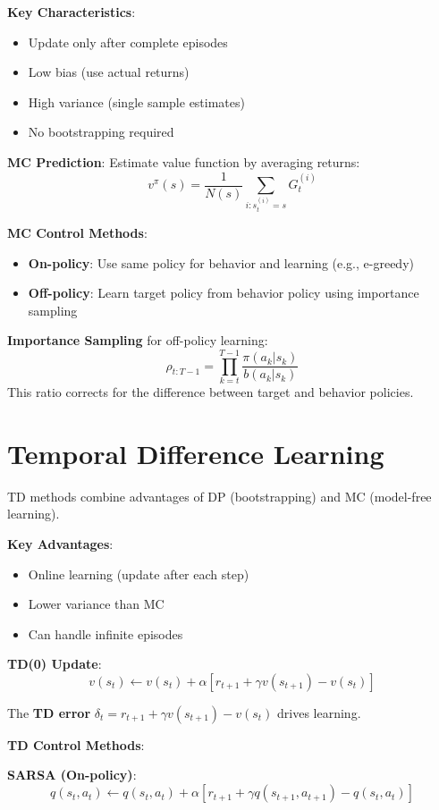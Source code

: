 \documentclass[a4paper,11pt]{article}
\newcommand{\cf}[1]{\[#1\]}
\newcommand{\f}[1]{${#1}$}
\renewcommand{\b}[1]{\textbf{#1}}
\begin{document}
\b{Key Characteristics}:
\begin{itemize}
    \item Update only after complete episodes
    \item Low bias (use actual returns)
    \item High variance (single sample estimates)
    \item No bootstrapping required
\end{itemize}

\textbf{MC Prediction}: Estimate value function by averaging returns:
\cf{v^\pi(s) = \frac{1}{N(s)} \sum_{i: s_t^{(i)} = s} G_t^{(i)}}

\b{MC Control Methods}:
\begin{itemize}
    \item \textbf{On-policy}: Use same policy for behavior and learning (e.g., e-greedy)
    \item \textbf{Off-policy}: Learn target policy from behavior policy using importance sampling
\end{itemize}

\textbf{Importance Sampling} for off-policy learning:
\cf{\rho_{t:T-1} = \prod_{k=t}^{T-1} \frac{\pi(a_k|s_k)}{b(a_k|s_k)}}
This ratio corrects for the difference between target and behavior policies.

\section{Temporal Difference Learning}

TD methods combine advantages of DP (bootstrapping) and MC (model-free learning).

\b{Key Advantages}:
\begin{itemize}
    \item Online learning (update after each step)
    \item Lower variance than MC
    \item Can handle infinite episodes
\end{itemize}

\textbf{TD(0) Update}:
\cf{v(s_t) \leftarrow v(s_t) + \alpha[r_{t+1} + \gamma v(s_{t+1}) - v(s_t)]}

The \textbf{TD error} \f{\delta_t = r_{t+1} + \gamma v(s_{t+1}) - v(s_t)} drives learning.

\b{TD Control Methods}:

\textbf{SARSA (On-policy)}:
\cf{q(s_t,a_t) \leftarrow q(s_t,a_t) + \alpha[r_{t+1} + \gamma q(s_{t+1},a_{t+1}) - q(s_t,a_t)]}
\end{document}
